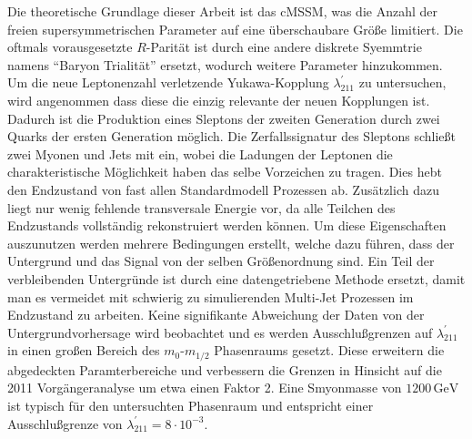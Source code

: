 \documentclass[11pt,a4paper,twoside,openright,DIV=13,BCOR=1cm]{scrbook} %
\numberwithin{equation}{chapter} %
\numberwithin{figure}{chapter} %
\numberwithin{table}{chapter} %
\begin{document}
Die theoretische Grundlage dieser Arbeit ist das cMSSM, was die Anzahl der freien supersymmetrischen Parameter auf eine überschaubare Größe limitiert. Die oftmals vorausgesetzte $R$-Parität ist durch eine andere diskrete Syemmtrie namens ``Baryon Trialität'' ersetzt, wodurch weitere Parameter hinzukommen. Um die neue Leptonenzahl verletzende Yukawa-Kopplung $\lambda^\prime_{211}$ zu untersuchen, wird angenommen dass diese die einzig relevante der neuen Kopplungen ist. Dadurch ist die Produktion eines Sleptons der zweiten Generation durch zwei Quarks der ersten Generation möglich. Die Zerfallssignatur des Sleptons schließt zwei Myonen und Jets mit ein, wobei die Ladungen der Leptonen die charakteristische Möglichkeit haben das selbe Vorzeichen zu tragen. Dies hebt den Endzustand von fast allen Standardmodell Prozessen ab. Zusätzlich dazu liegt nur wenig fehlende transversale Energie vor, da alle Teilchen des Endzustands vollständig rekonstruiert werden können. Um diese Eigenschaften auszunutzen werden mehrere Bedingungen erstellt, welche dazu führen, dass der Untergrund und das Signal von der selben Größenordnung sind. Ein Teil der verbleibenden Untergründe ist durch eine datengetriebene Methode ersetzt, damit man es vermeidet mit schwierig zu simulierenden Multi-Jet Prozessen im Endzustand zu arbeiten. Keine signifikante Abweichung der Daten von der Untergrundvorhersage wird beobachtet und es werden Ausschlußgrenzen auf $\lambda^\prime_{211}$ in einen großen Bereich des $m_0$-$m_{1/2}$ Phasenraums gesetzt. Diese erweitern die abgedeckten Paramterbereiche und verbessern die Grenzen in Hinsicht auf die 2011 Vorgängeranalyse um etwa einen Faktor 2. Eine Smyonmasse von $1200\,\text{GeV}$ ist typisch für den untersuchten Phasenraum und entspricht einer Ausschlußgrenze von $\lambda^\prime_{211} = 8 \cdot 10^{-3}$.



\newpage
\tableofcontents














\appendix

% 



\printbibliography[heading=bibintoc]
\end{document}
